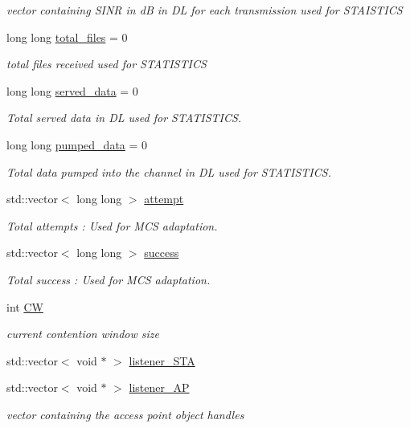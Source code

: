 \begin{DoxyCompactItemize}
\begin{DoxyCompactList}\small\item\em vector containing S\-I\-N\-R in d\-B in D\-L for each transmission used for S\-T\-A\-I\-S\-T\-I\-C\-S \end{DoxyCompactList}\item 
long long \hyperlink{classAP_aac5ade30eaf4b86c9b32ff7d37974a55}{total\-\_\-files} = 0
\begin{DoxyCompactList}\small\item\em total files received used for S\-T\-A\-T\-I\-S\-T\-I\-C\-S \end{DoxyCompactList}\item 
long long \hyperlink{classAP_a623295f5718f46c234a8ae496f1ff65d}{served\-\_\-data} = 0
\begin{DoxyCompactList}\small\item\em Total served data in D\-L used for S\-T\-A\-T\-I\-S\-T\-I\-C\-S. \end{DoxyCompactList}\item 
long long \hyperlink{classAP_ae7f2e09d8692bea041bbc7ff00521795}{pumped\-\_\-data} = 0
\begin{DoxyCompactList}\small\item\em Total data pumped into the channel in D\-L used for S\-T\-A\-T\-I\-S\-T\-I\-C\-S. \end{DoxyCompactList}\item 
std\-::vector$<$ long long $>$ \hyperlink{classAP_aa15c857fb5fb5d7688f1ee49d43a2aee}{attempt}
\begin{DoxyCompactList}\small\item\em Total attempts \-: Used for M\-C\-S adaptation. \end{DoxyCompactList}\item 
std\-::vector$<$ long long $>$ \hyperlink{classAP_aa9d8130f487d3ba13dc6b22fe5e3868d}{success}
\begin{DoxyCompactList}\small\item\em Total success \-: Used for M\-C\-S adaptation. \end{DoxyCompactList}\item 
int \hyperlink{classAP_a5f5fc6fd5279167b196a6387ff49825b}{C\-W}
\begin{DoxyCompactList}\small\item\em current contention window size \end{DoxyCompactList}\item 
std\-::vector$<$ void $\ast$ $>$ \hyperlink{classAP_af0d74685fc274f17734ee022b64d9931}{listener\-\_\-\-S\-T\-A}
\item 
std\-::vector$<$ void $\ast$ $>$ \hyperlink{classAP_ab22d52d2f2568ccb060a3a8b12a670f3}{listener\-\_\-\-A\-P}
\begin{DoxyCompactList}\small\item\em vector containing the access point object handles \end{DoxyCompactList}\end{DoxyCompactItemize}
